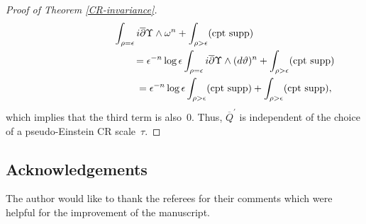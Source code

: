 \documentclass[pdftex]{sigma}
\numberwithin{equation}{section}
\begin{document}
\begin{proof}[Proof of Theorem \ref{CR-invariance}]
\begin{gather*}
\int_{\rho=\epsilon} i\overline{\partial}\Upsilon\wedge \omega^n+\int_{\rho>\epsilon} ({\rm cpt\ supp}) \\
\hphantom{\int_{\rho>\epsilon} i\partial\log\rho\wedge \overline{\partial}\Upsilon\wedge \omega^n}{}
 =\epsilon^{-n}\log\epsilon\int_{\rho=\epsilon} i\overline{\partial}\Upsilon\wedge (d\vartheta)^n+\int_{\rho>\epsilon} ({\rm cpt\ supp}) \\
 \hphantom{\int_{\rho>\epsilon} i\partial\log\rho\wedge \overline{\partial}\Upsilon\wedge \omega^n}{}
 =\epsilon^{-n}\log\epsilon\int_{\rho>\epsilon} ({\rm cpt\ supp})+\int_{\rho>\epsilon} ({\rm cpt\ supp}),
\end{gather*}
which implies that the third term is also~0. Thus, $\overline{Q}^\prime$ is independent of the choice of a pseudo-Einstein CR scale~$\tau$.\end{proof}

\subsection*{Acknowledgements}

The author would like to thank the referees for their comments which were helpful for the improvement of the manuscript.
\end{document}
